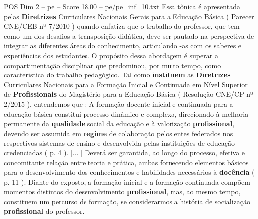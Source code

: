 \begin{textsample}{POS Dim 2 – pe – Score 18.00 – pe/pe\_inf\_10.txt}
Essa tônica é apresentada pelas \textbf{Diretrizes} Curriculares Nacionais Gerais para a Educação Básica ( Parecer CNE/CEB nº 7/2010 ) quando enfatiza que o trabalho do professor, que tem como um dos desafios a transposição didática, deve ser pautado na perspectiva de integrar as diferentes áreas do conhecimento, articulando -as com os saberes e experiências dos estudantes.
O propósito dessa abordagem é superar a compartimentação disciplinar que predominou, por muito tempo, como característica do trabalho pedagógico.
Tal como \textbf{instituem} as \textbf{Diretrizes} Curriculares Nacionais para a Formação Inicial e Continuada em Nível Superior de \textbf{Profissionais} do Magistério para a Educação Básica ( Resolução CNE/CP nº 2/2015 ), entendemos que : A formação docente inicial e continuada para a educação básica constitui processo dinâmico e complexo, direcionado à melhoria permanente da \textbf{qualidade} social da educação e à valorização \textbf{profissional}, devendo ser assumida em \textbf{regime} de colaboração pelos entes federados nos respectivos sistemas de ensino e desenvolvida pelas instituições de educação credenciadas ( p. 4 ). [... ] Deverá ser garantida, ao longo do processo, efetiva e concomitante relação entre teoria e prática, ambas fornecendo elementos básicos para o desenvolvimento dos conhecimentos e habilidades necessários à \textbf{docência} ( p. 11 ).
Diante do exposto, a formação inicial e a formação continuada compõem momentos distintos do desenvolvimento \textbf{profissional}, mas, ao mesmo tempo, constituem um percurso de formação, se considerarmos a história de socialização \textbf{profissional} do professor.

\end{textsample}
